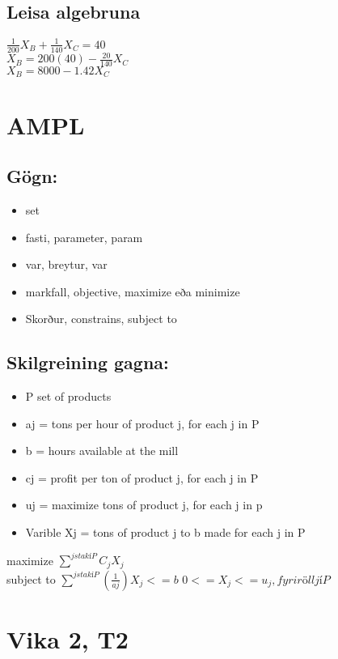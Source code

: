 \documentclass[]{article}
\begin{document}
\subsection*{Leisa algebruna}
$\frac{1}{200}X_{B} + \frac{1}{140}X_{C} = 40$ \\
$X_{B} = 200(40) - \frac{20}{140}X_{C}$ \\
$X_{B} = 8000 - 1.42X_{C}$

\section*{AMPL}

\subsection*{Gögn:}
\begin{itemize}
	\item set
	\item fasti, parameter, param
	\item var, breytur, var
	\item markfall, objective, maximize eða minimize
	\item Skorður, constrains,  subject to
\end{itemize}

\subsection*{Skilgreining gagna:}
\begin{itemize}
	\item P set of products
	\item aj = tons per hour of product j, for each j in P
	\item b = hours available at the mill
	\item cj = profit per ton of product j, for each j in P
	\item uj = maximize tons of product j, for each j in p	
	\item Varible  Xj = tons of product j to b made for each j in P
\end{itemize}
maximize $\sum_{}^{j stak í P}C_{j}X_{j}$ \\
subject to $\sum_{}^{j stak í P}(\frac{1}{aj})X_{j} <= b$
$0 <= X_{j} <= u_{j}, fyrir öll j í P$

\section*{Vika 2, T2}
\end{document}
